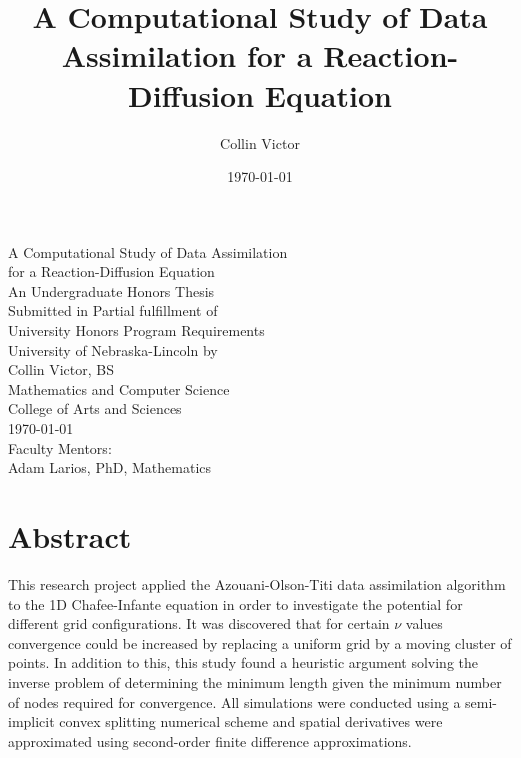 \documentclass[12pt]{amsart}
\title[Data Assimilation for Reaction-Diffusion]{A Computational Study of Data Assimilation for a Reaction-Diffusion Equation}
\date{\today}
\author{Collin Victor}
\theoremstyle{plain}
\theoremstyle{definition}
\theoremstyle{remark}
\numberwithin{equation}{section} %
\numberwithin{figure}{section}   %
\begin{document}
	\doublespacing
\begin{titlepage}
	\begin{center}
		\vspace{3cm}\large
	A Computational Study of Data Assimilation\\ for a Reaction-Diffusion Equation\\

		\vspace{3cm}
		\normalsize
		An Undergraduate Honors Thesis\\
		Submitted in Partial fulfillment of\\
		University Honors Program Requirements\\
		University of Nebraska-Lincoln
		\vspace{3cm}
		by\\
	Collin Victor, BS\\
		Mathematics and Computer Science\\
		College of Arts and Sciences\\
\vfill
		\today\\
		\vspace{3cm}
		Faculty Mentors:\\
		Adam Larios, PhD, Mathematics\\
		\vspace*{3cm}
		
		
	\end{center}
\end{titlepage}
\section*{Abstract}\label{abstract}
This research project applied the  Azouani-Olson-Titi data assimilation algorithm \cite{AOT1,AOT2} to the 1D Chafee-Infante equation in order to investigate the potential for different grid configurations. It was discovered that for certain $\nu$ values convergence could be increased by replacing a uniform grid by a moving cluster of points. In addition to this, this study found a heuristic argument solving the inverse problem of determining the minimum length given the minimum number of nodes required for convergence. All simulations were conducted using a semi-implicit convex splitting numerical scheme \cite{Eyre} and spatial derivatives were approximated using second-order finite difference approximations. 
\end{document}
